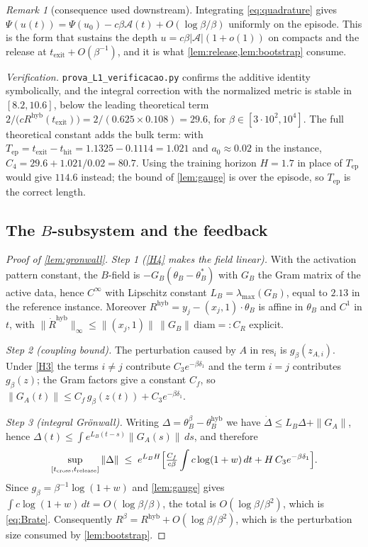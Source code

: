 \documentclass[11pt]{article}
\theoremstyle{definition}
\theoremstyle{remark}
\newtheorem{remark}[remark]{Remark}
\newcommand{\thit}{t_{\mathrm{hit}}}
\newcommand{\texit}{t_{\mathrm{exit}}}
\newcommand{\trel}{t_{\mathrm{release}}}
\newcommand{\Ar}{\mathcal{A}}                      %
\newcommand{\Tep}{T_{\mathrm{ep}}}                 %
\newcommand{\hyb}{\mathrm{hyb}}
\begin{document}
\begin{remark}[consequence used downstream]\label{rem:L1cons}
Integrating \eqref{eq:quadrature} gives
$\Psi(u(t))=\Psi(u_0)-c\beta\Ar(t)+O(\log\beta/\beta)$ uniformly on the episode.
This is the form that sustains the depth $u=c\beta|\Ar|(1+o(1))$ on compacts and
the release at $\texit+O(\beta^{-1})$, and it is what
\cref{lem:release,lem:bootstrap} consume.
\end{remark}

\noindent\emph{Verification.} \texttt{prova\_L1\_verificacao.py} confirms the
additive identity symbolically, and the integral correction with the normalized
metric is stable in $[8.2,10.6]$, below the leading theoretical term
$2/\bigl(cR^{\hyb}(\texit)\bigr)=2/(0.625\times0.108)=29.6$, for
$\beta\in[3\cdot10^2,10^4]$. The full theoretical constant adds the bulk term:
with $\Tep=\texit-\thit=1.1325-0.1114=1.021$ and $a_0\approx0.02$ in the instance,
$C_4=29.6+1.021/0.02=80.7$. Using the training horizon $H=1.7$ in place of $\Tep$
would give $114.6$ instead; the bound of \cref{lem:gauge} is over the episode,
so $\Tep$ is the correct length.

\subsection{The \texorpdfstring{$B$}{B}-subsystem and the feedback}\label{app:L2}

\begin{proof}[Proof of \cref{lem:gronwall}]
\emph{Step 1 (\eqref{H4} makes the field linear).} With the activation pattern
constant, the $B$-field is $-G_B(\theta_B-\theta_B^\ast)$ with $G_B$ the Gram
matrix of the active data, hence $C^\infty$ with Lipschitz constant
$L_B=\lambda_{\max}(G_B)$, equal to $2.13$ in the reference instance. Moreover
$R^{\hyb}=y_j-(x_j,1)\cdot\theta_B$ is affine in $\theta_B$ and $C^1$ in $t$,
with $\|\dot R^{\hyb}\|_\infty\le\|(x_j,1)\|\,\|G_B\|\,\mathrm{diam}=:C_R$
explicit.

\emph{Step 2 (coupling bound).} The perturbation caused by $A$ in
$\mathrm{res}_i$ is $g_\beta(z_{A,i})$. Under \eqref{H3} the terms $i\ne j$
contribute $C_3e^{-\beta\delta_1}$ and the term $i=j$ contributes $g_\beta(z)$;
the Gram factors give a constant $C_f$, so
$\|G_A(t)\|\le C_f\,g_\beta(z(t))+C_3e^{-\beta\delta_1}$.

\emph{Step 3 (integral Gr\"onwall).} Writing $\Delta=\theta_B^\beta-\theta_B^{\hyb}$
we have $\dot\Delta\le L_B\Delta+\|G_A\|$, hence
$\Delta(t)\le\int e^{L_B(t-s)}\|G_A(s)\|\,ds$, and therefore
\[
\sup_{[t_{\mathrm{cross}},\trel]}\|\Delta\|
\;\le\;e^{L_BH}\Bigl[\tfrac{C_f}{c\beta}\int c\log(1+w)\,dt
+H\,C_3e^{-\beta\delta_1}\Bigr].
\]
Since $g_\beta=\beta^{-1}\log(1+w)$ and \cref{lem:gauge} gives
$\int c\log(1+w)\,dt=O(\log\beta/\beta)$, the total is $O(\log\beta/\beta^{2})$,
which is \eqref{eq:Brate}. Consequently $R^\beta=R^{\hyb}+O(\log\beta/\beta^{2})$,
which is the perturbation size consumed by \cref{lem:bootstrap}.
\end{proof}
\end{document}
